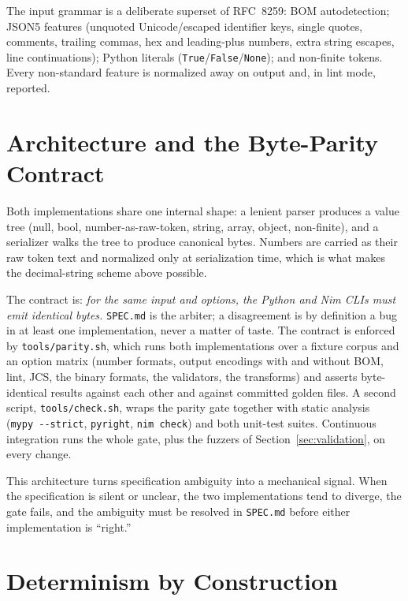 \documentclass[11pt]{article}
\newcommand{\code}[1]{\texttt{#1}}
\begin{document}
The input grammar is a deliberate superset of RFC~8259: BOM autodetection;
JSON5 features (unquoted Unicode/escaped identifier keys, single quotes,
comments, trailing commas, hex and leading-plus numbers, extra string escapes,
line continuations); Python literals (\code{True}/\code{False}/\code{None});
and non-finite tokens. Every non-standard feature is normalized away on output
and, in lint mode, reported.

\section{Architecture and the Byte-Parity Contract}\label{sec:arch}

Both implementations share one internal shape: a lenient parser produces a
value tree (null, bool, number-as-raw-token, string, array, object,
non-finite), and a serializer walks the tree to produce canonical bytes.
Numbers are carried as their raw token text and normalized only at serialization
time, which is what makes the decimal-string scheme above possible.

The contract is: \emph{for the same input and options, the Python and Nim CLIs
must emit identical bytes.} \code{SPEC.md} is the arbiter; a disagreement is by
definition a bug in at least one implementation, never a matter of taste. The
contract is enforced by \code{tools/parity.sh}, which runs both implementations
over a fixture corpus and an option matrix (number formats, output encodings
with and without BOM, lint, JCS, the binary formats, the validators, the
transforms) and asserts byte-identical results against each other and against
committed golden files. A second script, \code{tools/check.sh}, wraps the parity
gate together with static analysis (\code{mypy~-{}-strict}, \code{pyright},
\code{nim~check}) and both unit-test suites. Continuous integration runs the
whole gate, plus the fuzzers of Section~\ref{sec:validation}, on every change.

This architecture turns specification ambiguity into a mechanical signal. When
the specification is silent or unclear, the two implementations tend to diverge,
the gate fails, and the ambiguity must be resolved in \code{SPEC.md} before
either implementation is ``right.''

\section{Determinism by Construction}\label{sec:determinism}
\end{document}
